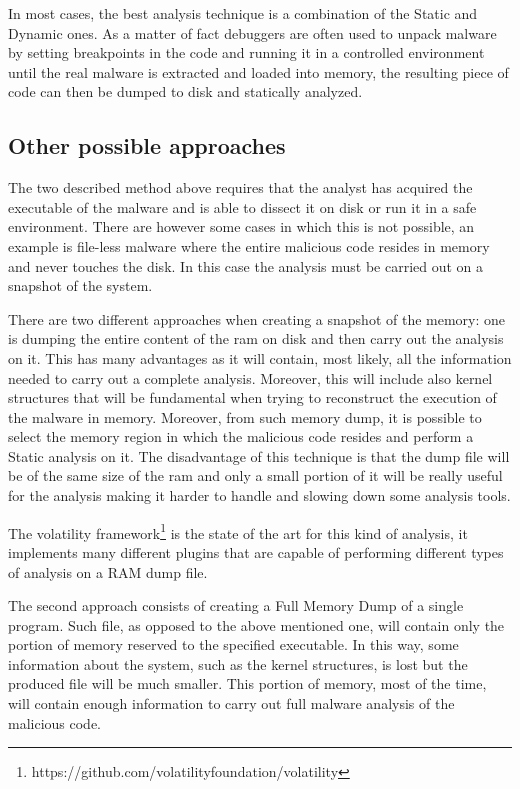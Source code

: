 In most cases, the best analysis technique is a combination of the Static and Dynamic ones. As a matter of fact debuggers are often used to unpack malware by setting breakpoints in the code and running it in a controlled environment until the real malware is extracted and loaded into memory, the resulting piece of code can then be dumped to disk and statically analyzed.

\subsection{Other possible approaches}

The two described method above requires that the analyst has acquired the executable of the malware and is able to dissect it on disk or run it in a safe environment. There are however some cases in which this is not possible, an example is file-less malware where the entire malicious code resides in memory and never touches the disk. In this case the analysis must be carried out on a snapshot of the system. 

There are two different approaches when creating a snapshot of the memory: one is dumping the entire content of the ram on disk and then carry out the analysis on it. This has many advantages as it will contain, most likely, all the information needed to carry out a complete analysis. Moreover, this will include also kernel structures that will be fundamental when trying to reconstruct the execution of the malware in memory. Moreover, from such memory dump, it is possible to select the memory region in which the malicious code resides and perform a Static analysis on it. The disadvantage of this technique is that the dump file will be of the same size of the ram and only a small portion of it will be really useful for the analysis making it harder to handle and slowing down some analysis tools. 

The volatility framework\footnote{https://github.com/volatilityfoundation/volatility} is the state of the art for this kind of analysis, it implements many different plugins that are capable of performing different types of analysis on a RAM dump file. 

The second approach consists of creating a Full Memory Dump of a single program. Such file, as opposed to the above mentioned one, will contain only the portion of memory reserved to the specified executable. In this way, some information about the system, such as the kernel structures, is lost but the produced file will be much smaller. This portion of memory, most of the time, will contain enough information to carry out full malware analysis of the malicious code.   

